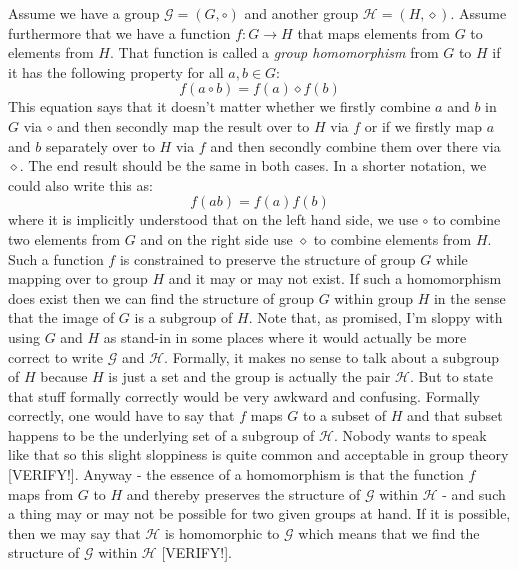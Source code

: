 Assume we have a group $\mathcal{G} = (G, \circ)$ and another group $\mathcal{H} = (H, \diamond)$. Assume furthermore that we have a function $f: G \rightarrow H$ that maps elements from $G$ to elements from $H$. That function is called a \emph{group homomorphism} from $G$ to $H$ if it has the following property for all $a,b \in G$:
\begin{equation}
	f(a \circ b) = f(a) \diamond f(b)
\end{equation}
This equation says that it doesn't matter whether we firstly combine $a$ and $b$ in $G$ via $\circ$ and then secondly map the result over to $H$ via $f$ or if we firstly map $a$ and $b$ separately over to $H$ via $f$ and then secondly combine them over there via $\diamond$. The end result should be the same in both cases. In a shorter notation, we could also write this as:
\begin{equation}
  f(a  b) = f(a) f(b)
\end{equation}
where it is implicitly understood that on the left hand side, we use $\circ$ to combine two elements from $G$ and on the right side use $\diamond$ to combine elements from $H$. Such a function $f$ is constrained to preserve the structure of group $G$ while mapping over to group $H$ and it may or may not exist. If such a homomorphism does exist then we can find the structure of group $G$ within group $H$ in the sense that the image of $G$ is a subgroup of $H$. Note that, as promised, I'm sloppy with using $G$ and $H$ as stand-in in some places where it would actually be more correct to write $\mathcal{G}$ and $\mathcal{H}$. Formally, it makes no sense to talk about a subgroup of $H$ because $H$ is just a set and the group is actually the pair $\mathcal{H}$. But to state that stuff formally correctly would be very awkward and confusing. Formally correctly, one would have to say that $f$ maps $G$ to a subset of $H$ and that subset happens to be the underlying set of a subgroup of $\mathcal{H}$. Nobody wants to speak like that so this slight sloppiness is quite common and acceptable in group theory [VERIFY!]. Anyway - the essence of a  homomorphism is that the function $f$ maps from $G$ to $H$ and thereby preserves the structure of $\mathcal{G}$ within $\mathcal{H}$ - and such a thing may or may not be possible for two given groups at hand. If it is possible, then we may say that $\mathcal{H}$ is homomorphic to $\mathcal{G}$ which means that we find the structure of $\mathcal{G}$ within $\mathcal{H}$ [VERIFY!].


